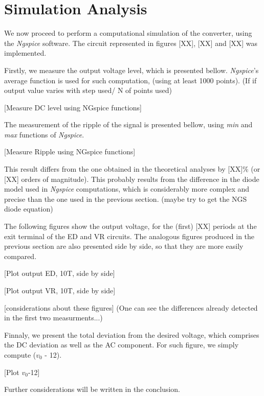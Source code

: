 \section{Simulation Analysis}
\label{sec:simulation}

\par We now proceed to perform a computational simulation of the converter, using the \textit{Ngspice} software. The circuit represented in figures [XX], [XX] and [XX] was implemented.

Firstly, we measure the output voltage level, which is presented bellow. \textit{Ngspice}'s average function is used for such computation, (using at least 1000 points). (If if output value varies with step used/ N of points used)

[Measure DC level using NGspice functions]

The measurement of the ripple of the signal is presented bellow, using \textit{min} and \textit{max} functions of \textit{Ngspice}.

[Measure Ripple using NGspice functions]

This result differs from the one obtained in the theoretical analyses by [XX]\% (or [XX] orders of magnitude). This probably results from the difference in the diode model used in \textit{Ngspice} computations, which is considerably more complex and precise than the one used in the previous section. (maybe try to get the NGS diode equation)

The following figures show the output voltage, for the (first) [XX] periods at the exit terminal of the ED and VR circuits.  The analogous figures produced in the previous section are also presented side by side, so that they are more easily compared. 

[Plot output ED, 10T, side by side]

[Plot output VR, 10T, side by side]

[considerations about these figures]
(One can see the differences already detected in the first two measurments...)

Finnaly, we present the total deviation from the desired voltage, which comprises the DC deviation as well as the AC component. For such figure, we simply compute ($v_0$ - 12). 


[Plot $v_0$-12]

Further considerations will be written in the conclusion.


